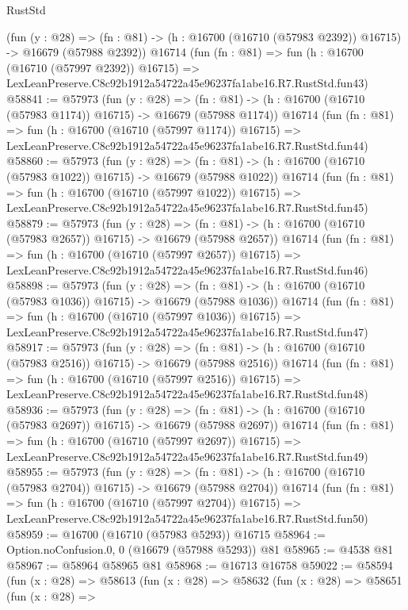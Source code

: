 \begin{lexlean}{RustStd}
\begin{coremodule}
    (fun (y : @28) =>
    (fn : @81) -> (h : @16700 (@16710 (@57983 @2392)) @16715) -> @16679 (@57988 @2392))
    @16714
    (fun (fn : @81) =>
    fun (h : @16700 (@16710 (@57997 @2392)) @16715) =>
    LexLeanPreserve.C8c92b1912a54722a45e96237fa1abe16.R7.RustStd.fun43)
@58841 := @57973
    (fun (y : @28) =>
    (fn : @81) -> (h : @16700 (@16710 (@57983 @1174)) @16715) -> @16679 (@57988 @1174))
    @16714
    (fun (fn : @81) =>
    fun (h : @16700 (@16710 (@57997 @1174)) @16715) =>
    LexLeanPreserve.C8c92b1912a54722a45e96237fa1abe16.R7.RustStd.fun44)
@58860 := @57973
    (fun (y : @28) =>
    (fn : @81) -> (h : @16700 (@16710 (@57983 @1022)) @16715) -> @16679 (@57988 @1022))
    @16714
    (fun (fn : @81) =>
    fun (h : @16700 (@16710 (@57997 @1022)) @16715) =>
    LexLeanPreserve.C8c92b1912a54722a45e96237fa1abe16.R7.RustStd.fun45)
@58879 := @57973
    (fun (y : @28) =>
    (fn : @81) -> (h : @16700 (@16710 (@57983 @2657)) @16715) -> @16679 (@57988 @2657))
    @16714
    (fun (fn : @81) =>
    fun (h : @16700 (@16710 (@57997 @2657)) @16715) =>
    LexLeanPreserve.C8c92b1912a54722a45e96237fa1abe16.R7.RustStd.fun46)
@58898 := @57973
    (fun (y : @28) =>
    (fn : @81) -> (h : @16700 (@16710 (@57983 @1036)) @16715) -> @16679 (@57988 @1036))
    @16714
    (fun (fn : @81) =>
    fun (h : @16700 (@16710 (@57997 @1036)) @16715) =>
    LexLeanPreserve.C8c92b1912a54722a45e96237fa1abe16.R7.RustStd.fun47)
@58917 := @57973
    (fun (y : @28) =>
    (fn : @81) -> (h : @16700 (@16710 (@57983 @2516)) @16715) -> @16679 (@57988 @2516))
    @16714
    (fun (fn : @81) =>
    fun (h : @16700 (@16710 (@57997 @2516)) @16715) =>
    LexLeanPreserve.C8c92b1912a54722a45e96237fa1abe16.R7.RustStd.fun48)
@58936 := @57973
    (fun (y : @28) =>
    (fn : @81) -> (h : @16700 (@16710 (@57983 @2697)) @16715) -> @16679 (@57988 @2697))
    @16714
    (fun (fn : @81) =>
    fun (h : @16700 (@16710 (@57997 @2697)) @16715) =>
    LexLeanPreserve.C8c92b1912a54722a45e96237fa1abe16.R7.RustStd.fun49)
@58955 := @57973
    (fun (y : @28) =>
    (fn : @81) -> (h : @16700 (@16710 (@57983 @2704)) @16715) -> @16679 (@57988 @2704))
    @16714
    (fun (fn : @81) =>
    fun (h : @16700 (@16710 (@57997 @2704)) @16715) =>
    LexLeanPreserve.C8c92b1912a54722a45e96237fa1abe16.R7.RustStd.fun50)
@58959 := @16700 (@16710 (@57983 @5293)) @16715
@58964 := Option.noConfusion.{0, 0} (@16679 (@57988 @5293)) @81
@58965 := @4538 @81
@58967 := @58964 @58965 @81
@58968 := @16713 @16758
@59022 := @58594
    (fun (x : @28) =>
    @58613
      (fun (x : @28) =>
      @58632
        (fun (x : @28) =>
        @58651
          (fun (x : @28) =>

\end{coremodule}
\end{lexlean}
